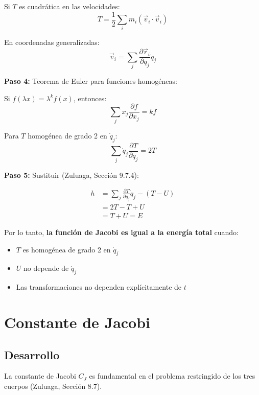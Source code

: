 \documentclass[a4paper]{article}
\begin{document}
Si $T$ es cuadrática en las velocidades:
\begin{equation}
T = \frac{1}{2}\sum_i m_i (\vec{v}_i \cdot \vec{v}_i)
\end{equation}

En coordenadas generalizadas:
\begin{equation}
\vec{v}_i = \sum_j \frac{\partial \vec{r}_i}{\partial q_j}\dot{q}_j
\end{equation}

\textbf{Paso 4:} Teorema de Euler para funciones homogéneas:

Si $f(\lambda x) = \lambda^k f(x)$, entonces:
\begin{equation}
\sum_j x_j \frac{\partial f}{\partial x_j} = k f
\end{equation}

Para $T$ homogénea de grado 2 en $\dot{q}_j$:
\begin{equation}
\sum_j \dot{q}_j \frac{\partial T}{\partial \dot{q}_j} = 2T
\end{equation}

\textbf{Paso 5:} Sustituir (Zuluaga, Sección 9.7.4):

\begin{align}
h &= \sum_j \frac{\partial T}{\partial \dot{q}_j}\dot{q}_j - (T-U) \\
&= 2T - T + U \\
&= T + U = E
\end{align}

Por lo tanto, \textbf{la función de Jacobi es igual a la energía total} cuando:
\begin{itemize}
    \item $T$ es homogénea de grado 2 en $\dot{q}_j$
    \item $U$ no depende de $\dot{q}_j$
    \item Las transformaciones no dependen explícitamente de $t$
\end{itemize}

\section{Constante de Jacobi}

\subsection*{Desarrollo}

La constante de Jacobi $C_J$ es fundamental en el problema restringido de los tres cuerpos (Zuluaga, Sección 8.7).
\end{document}
